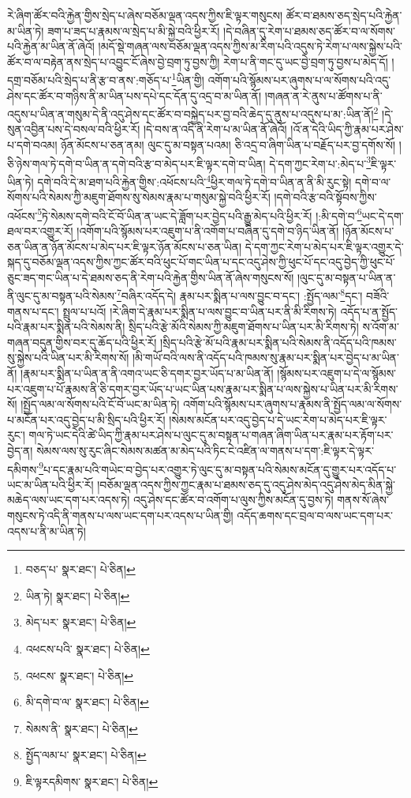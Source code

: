 རེ་ཞིག་ཚོར་བའི་རྐྱེན་གྱིས་སྲེད་པ་ཞེས་བཅོམ་ལྡན་འདས་ཀྱིས་ཇི་ལྟར་གསུངས། ཚོར་བ་ཐམས་ཅད་སྲེད་པའི་རྐྱེན་མ་ཡིན་ཏེ། ཟག་པ་ཟད་པ་རྣམས་ལ་སྲེད་པ་མི་སྐྱེ་བའི་ཕྱིར་རོ། །དེ་བཞིན་དུ་རེག་པ་ཐམས་ཅད་ཚོར་བ་ལ་སོགས་པའི་རྐྱེན་མ་ཡིན་ནོ་ཞེའོ། །མདོ་སྡེ་གཞན་ལས་བཅོམ་ལྡན་འདས་ཀྱིས་མ་རིག་པའི་འདུས་ཏེ་རེག་པ་ལས་སྐྱེས་པའི་ཚོར་བ་ལ་བརྟེན་ནས་སྲེད་པ་འབྱུང་ངོ་ཞེས་བྱེ་བྲག་ཏུ་བྱས་ཀྱི། རེག་པ་ནི་གང་དུ་ཡང་བྱེ་བྲག་ཏུ་བྱས་པ་མེད་དོ། །དགྲ་བཅོམ་པའི་སྲེད་པ་ནི་རྩ་བ་ནས་:གཅོད་པ་\footnote{བཅད་པ་  སྣར་ཐང་།  པེ་ཅིན། }ཡིན་གྱི། འགོག་པའི་སྙོམས་པར་ཞུགས་པ་ལ་སོགས་པའི་འདུ་ཤེས་དང་ཚོར་བ་གཉིས་ནི་མ་ཡིན་པས་དཔེ་དང་དོན་དུ་འདྲ་བ་མ་ཡིན་ནོ། །གཞན་ན་རེ་ནུས་པ་ཚོགས་པ་ནི་འདུས་པ་ཡིན་ན་གསུམ་དེ་ནི་འདུ་ཤེས་དང་ཚོར་བ་བསྐྱེད་པར་བྱ་བའི་ཆེད་དུ་ནུས་པ་འདུས་པ་མ་:ཡིན་ནོ།\footnote{ཡིན་ཏེ།  སྣར་ཐང་།  པེ་ཅིན། } །དེ་སུན་འབྱིན་པས་དེ་བསལ་བའི་ཕྱིར་རོ། །དེ་བས་ན་འདི་ནི་རེག་པ་མ་ཡིན་ནོ་ཞེའོ། །འོ་ན་དེའི་ཡིད་ཀྱི་རྣམ་པར་ཤེས་པ་དགེ་བའམ། ཉོན་མོངས་པ་ཅན་ནམ། ལུང་དུ་མ་བསྟན་པའམ། ཅི་འདྲ་བ་ཞིག་ཡིན་པ་བརྗོད་པར་བྱ་དགོས་སོ། །ཅི་ཉེས་གལ་ཏེ་དགེ་བ་ཡིན་ན་དགེ་བའི་རྩ་བ་མེད་པར་ཇི་ལྟར་དགེ་བ་ཡིན། དེ་དག་ཀྱང་རེག་པ་:མེད་པ་\footnote{མེད་པར་  སྣར་ཐང་།  པེ་ཅིན། }ཇི་ལྟར་ཡིན་ཏེ། དགེ་བའི་དེ་མ་ཐག་པའི་རྐྱེན་གྱིས་:འཕོངས་པའི་\footnote{འཕངས་པའི་  སྣར་ཐང་།  པེ་ཅིན། }ཕྱིར་གལ་ཏེ་དགེ་བ་ཡིན་ན་ནི་མི་རུང་སྟེ། དགེ་བ་ལ་སོགས་པའི་སེམས་ཀྱི་མཇུག་ཐོགས་སུ་སེམས་རྣམ་པ་གསུམ་སྐྱེ་བའི་ཕྱིར་རོ། །དགེ་བའི་རྩ་བའི་སྟོབས་ཀྱིས་འཕོངས་\footnote{འཕངས་  སྣར་ཐང་།  པེ་ཅིན། }ཏེ་སེམས་དགེ་བའི་ངོ་བོ་ཡིན་ན་ཡང་དེ་ཟློག་པར་བྱེད་པའི་རྒྱུ་མེད་པའི་ཕྱིར་རོ། །:མི་དགེ་བ་\footnote{མི་དགེ་བ་ལ་  སྣར་ཐང་།  པེ་ཅིན། }ཡང་དེ་དག་ཐལ་བར་འགྱུར་རོ། །འགོག་པའི་སྙོམས་པར་འཇུག་པ་ནི་འགོག་པ་བཞིན་དུ་དགེ་བ་ཉིད་ཡིན་ནོ། །ཉོན་མོངས་པ་ཅན་ཡིན་ན་ཉོན་མོངས་པ་མེད་པར་ཇི་ལྟར་ཉོན་མོངས་པ་ཅན་ཡིན། དེ་དག་ཀྱང་རེག་པ་མེད་པར་ཇི་ལྟར་འགྱུར་དེ་སྐད་དུ་བཅོམ་ལྡན་འདས་ཀྱིས་ཀྱང་ཚོར་བའི་ཕུང་པོ་གང་ཡིན་པ་དང་འདུ་ཤེས་ཀྱི་ཕུང་པོ་དང་འདུ་བྱེད་ཀྱི་ཕུང་པོ་ཅུང་ཟད་གང་ཡིན་པ་དེ་ཐམས་ཅད་ནི་རེག་པའི་རྐྱེན་གྱིས་ཡིན་ནོ་ཞེས་གསུངས་སོ། །ལུང་དུ་མ་བསྟན་པ་ཡིན་ན་ནི་ལུང་དུ་མ་བསྟན་པའི་སེམས་\footnote{སེམས་ནི་  སྣར་ཐང་།  པེ་ཅིན། }བཞིར་འདོད་དེ། རྣམ་པར་སྨིན་པ་ལས་བྱུང་བ་དང་། :སྤྱོད་ལམ་\footnote{སྤྱོད་ལམ་པ་  སྣར་ཐང་།  པེ་ཅིན། }དང་། བཟོའི་གནས་པ་དང་། སྤྲུལ་པ་པའོ། །རེ་ཞིག་དེ་རྣམ་པར་སྨིན་པ་ལས་བྱུང་བ་ཡིན་པར་ནི་མི་རིགས་ཏེ། འདོད་པ་ན་སྤྱོད་པའི་རྣམ་པར་སྨིན་པའི་སེམས་ནི། སྲིད་པའི་རྩེ་མོའི་སེམས་ཀྱི་མཇུག་ཐོགས་པ་ཡིན་པར་མི་རིགས་ཏེ། ས་འོག་མ་གཞན་བདུན་གྱིས་བར་དུ་ཆོད་པའི་ཕྱིར་རོ། །སྲིད་པའི་རྩེ་མོ་པའི་རྣམ་པར་སྨིན་པའི་སེམས་ནི་འདོད་པའི་ཁམས་སུ་སྐྱེས་པའི་ཡིན་པར་མི་རིགས་སོ། །མི་གཡོ་བའི་ལས་ནི་འདོད་པའི་ཁམས་སུ་རྣམ་པར་སྨིན་པར་བྱེད་པ་མ་ཡིན་ནོ། །རྣམ་པར་སྨིན་པ་ཡིན་ན་ནི་འགའ་ཡང་ཅི་དགར་བྱར་ཡོད་པ་མ་ཡིན་ནོ། །སྙོམས་པར་འཇུག་པ་དེ་ལ་སྙོམས་པར་འཇུག་པ་པོ་རྣམས་ནི་ཅི་དགར་བྱར་ཡོད་པ་ཡང་ཡིན་པས་རྣམ་པར་སྨིན་པ་ལས་སྐྱེས་པ་ཡིན་པར་མི་རིགས་སོ། །སྤྱོད་ལམ་ལ་སོགས་པའི་ངོ་བོ་ཡང་མ་ཡིན་ཏེ། འགོག་པའི་སྙོམས་པར་ཞུགས་པ་རྣམས་ནི་སྤྱོད་ལམ་ལ་སོགས་པ་མངོན་པར་འདུ་བྱེད་པ་མི་སྲིད་པའི་ཕྱིར་རོ། །སེམས་མངོན་པར་འདུ་བྱེད་པ་དེ་ཡང་རེག་པ་མེད་པར་ཇི་ལྟར་རུང་། གལ་ཏེ་ཡང་དེའི་ཚེ་ཡིད་ཀྱི་རྣམ་པར་ཤེས་པ་ལུང་དུ་མ་བསྟན་པ་གཞན་ཞིག་ཡིན་པར་རྣམ་པར་རྟོག་པར་བྱེད་ན། སེམས་ལས་སུ་རུང་ཞིང་སེམས་མཚན་མ་མེད་པའི་ཏིང་ངེ་འཛིན་ལ་གནས་པ་དག་:ཇི་ལྟར་དེ་ལྟར་དམིགས་\footnote{ཇི་ལྟརདམིགས་  སྣར་ཐང་།  པེ་ཅིན། }པ་དང་རྣམ་པའི་གཡེང་བ་བྱེད་པར་འགྱུར་ཏེ་ལུང་དུ་མ་བསྟན་པའི་སེམས་མངོན་དུ་གྱུར་པར་འདོད་པ་ཡང་མ་ཡིན་པའི་ཕྱིར་རོ། །བཅོམ་ལྡན་འདས་ཀྱིས་ཀྱང་རྣམ་པ་ཐམས་ཅད་དུ་འདུ་ཤེས་མེད་འདུ་ཤེས་མེད་མིན་སྐྱེ་མཆེད་ལས་ཡང་དག་པར་འདས་ཏེ། འདུ་ཤེས་དང་ཚོར་བ་འགོག་པ་ལུས་ཀྱིས་མངོན་དུ་བྱས་ཏེ། གནས་སོ་ཞེས་གསུངས་ཏེ་འདི་ནི་གནས་པ་ལས་ཡང་དག་པར་འདས་པ་ཡིན་གྱི། འདོད་ཆགས་དང་བྲལ་བ་ལས་ཡང་དག་པར་འདས་པ་ནི་མ་ཡིན་ཏེ། 